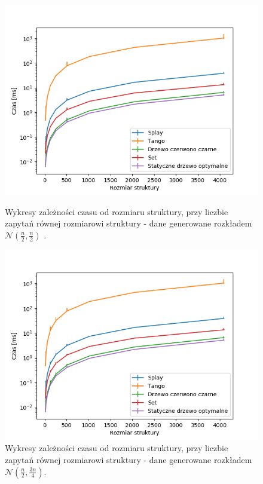 \documentclass[declaration,shortabstract]{iithesis}
\theoremstyle{thm}
\theoremstyle{remark}
\theoremstyle{plain}
\theoremstyle{plain}
\theoremstyle{plain}
\begin{document}
\begin{figure}[ht]
\begin{minipage}[b]{.45\textwidth}
\centering
\includegraphics[width=1\textwidth]{wykresy/gaus05_main.png}
\caption{Wykresy zależności czasu od rozmiaru struktury, przy liczbie zapytań równej rozmiarowi struktury - dane generowane rozkładem \(\mathcal{N}(\frac{n}{2}, \frac{n}{2})\) . }
\end{minipage}
\hfill
\begin{minipage}[b]{.45\textwidth}
\centering
\includegraphics[width=1\textwidth]{wykresy/gaus075_main.png}
\caption{Wykresy zależności czasu od rozmiaru struktury, przy liczbie zapytań równej rozmiarowi struktury - dane generowane rozkładem \(\mathcal{N}(\frac{n}{2}, \frac{3n}{4})\).}
\end{minipage}
\end{figure}
\end{document}
